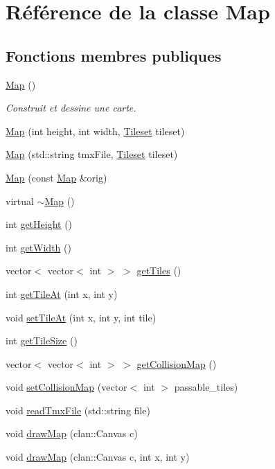 \hypertarget{classMap}{}\section{Référence de la classe Map}
\label{classMap}
\subsection*{Fonctions membres publiques}
\begin{DoxyCompactItemize}
\item 
\hyperlink{classMap_a0f5ad0fd4563497b4214038cbca8b582}{Map} ()
\begin{DoxyCompactList}\small\item\em Construit et dessine une carte. \end{DoxyCompactList}\item 
\hyperlink{classMap_a46ac1f99aad9f30fe227bbcbbc9bfb40}{Map} (int height, int width, \hyperlink{classTileset}{Tileset} tileset)
\item 
\hyperlink{classMap_a2cd2cd94fc4acf3d4929fb657ea2708f}{Map} (std\+::string tmx\+File, \hyperlink{classTileset}{Tileset} tileset)
\item 
\hyperlink{classMap_ad656e50a9b15ff4eb04c1b603d11d0f3}{Map} (const \hyperlink{classMap}{Map} \&orig)
\item 
virtual \hyperlink{classMap_aa403fbe09394ccf39747588f5168e3b2}{$\sim$\+Map} ()
\item 
int \hyperlink{classMap_a2b09c8875af2efb711fc3a022e70427d}{get\+Height} ()
\item 
int \hyperlink{classMap_afd34d12227676b3cebeed9f5fae2508f}{get\+Width} ()
\item 
vector$<$ vector$<$ int $>$ $>$ \hyperlink{classMap_a06f3a536bfac5e0e23497aa7b3bff0eb}{get\+Tiles} ()
\item 
int \hyperlink{classMap_addae7f55daf2a95b893bbeb4807fa7ec}{get\+Tile\+At} (int x, int y)
\item 
void \hyperlink{classMap_ac7894d7c53218b8a323119ed7cd9969a}{set\+Tile\+At} (int x, int y, int tile)
\item 
int \hyperlink{classMap_a1a165f12a747bc248016964acabfbc0e}{get\+Tile\+Size} ()
\item 
vector$<$ vector$<$ int $>$ $>$ \hyperlink{classMap_a0a937e8ca98865f0fff39657b70fc6fe}{get\+Collision\+Map} ()
\item 
void \hyperlink{classMap_ae7fb26d285fa138b674394b59d5186d9}{set\+Collision\+Map} (vector$<$ int $>$ passable\+\_\+tiles)
\item 
void \hyperlink{classMap_aa7b78361476169633bb9236ab2300381}{read\+Tmx\+File} (std\+::string file)
\item 
void \hyperlink{classMap_aa92361fe9347de4548b31a306f77764e}{draw\+Map} (clan\+::\+Canvas c)
\item 
void \hyperlink{classMap_a8bd29f94b805b8e29e4eac427e2ff0e1}{draw\+Map} (clan\+::\+Canvas c, int x, int y)
\end{DoxyCompactItemize}


